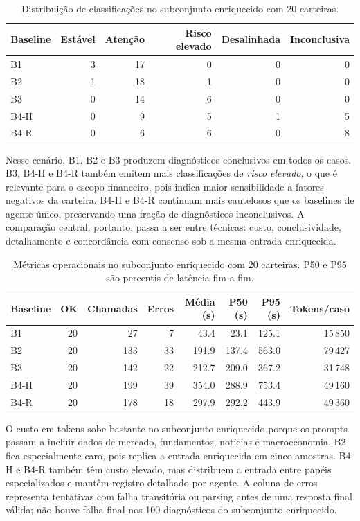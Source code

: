 \begin{table}[!t]
\centering
\caption{Distribuição de classificações no subconjunto enriquecido com 20 carteiras.}
\label{tab:classificacoes-enriquecido}
\begin{tabular}{@{}lrrrrr@{}}
\hline\hline
Baseline & Estável & Atenção & Risco elevado & Desalinhada & Inconclusiva \\
\hline
B1   & 3 & 17 & 0 & 0 & 0 \\
B2   & 1 & 18 & 1 & 0 & 0 \\
B3   & 0 & 14 & 6 & 0 & 0 \\
B4-H & 0 &  9 & 5 & 1 & 5 \\
B4-R & 0 &  6 & 6 & 0 & 8 \\
\hline\hline
\end{tabular}
\end{table}

Nesse cenário, B1, B2 e B3 produzem diagnósticos conclusivos em todos os
casos. B3, B4-H e B4-R também emitem mais classificações de
\textit{risco elevado}, o que é relevante para o escopo financeiro, pois
indica maior sensibilidade a fatores negativos da carteira. B4-H e B4-R
continuam mais cautelosos que os baselines de agente único, preservando uma
fração de diagnósticos inconclusivos. A comparação central, portanto, passa
a ser entre técnicas: custo, conclusividade, detalhamento e concordância
com consenso sob a mesma entrada enriquecida.

\begin{table}[!t]
\centering
\caption{Métricas operacionais no subconjunto enriquecido com 20 carteiras. P50 e P95 são percentis de latência fim a fim.}
\label{tab:operacional-enriquecido}
\begin{tabular}{@{}lrrrrrrr@{}}
\hline\hline
Baseline & OK & Chamadas & Erros & Média (s) & P50 (s) & P95 (s) & Tokens/caso \\
\hline
B1   & 20 &  27 &  7 &  43.4 &  23.1 & 125.1 & 15\,850 \\
B2   & 20 & 133 & 33 & 191.9 & 137.4 & 563.0 & 79\,427 \\
B3   & 20 & 142 & 22 & 212.7 & 209.0 & 367.2 & 31\,748 \\
B4-H & 20 & 199 & 39 & 354.0 & 288.9 & 753.4 & 49\,160 \\
B4-R & 20 & 178 & 18 & 297.9 & 292.2 & 443.9 & 49\,360 \\
\hline\hline
\end{tabular}
\end{table}

O custo em tokens sobe bastante no subconjunto enriquecido porque os
prompts passam a incluir dados de mercado, fundamentos, notícias e
macroeconomia. B2 fica especialmente caro, pois replica a entrada
enriquecida em cinco amostras. B4-H e B4-R também têm custo elevado,
mas distribuem a entrada entre papéis especializados e mantêm registro
detalhado por agente. A coluna de erros representa tentativas com falha
transitória ou parsing antes de uma resposta final válida; não houve falha
final nos 100 diagnósticos do subconjunto enriquecido.

